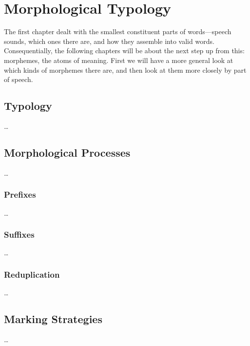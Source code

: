 
\chapter{Morphological Typology}

The first chapter dealt with the smallest constituent parts of words---speech 
sounds, which ones there are, and how they assemble into valid words. 
Consequentially, the following chapters will be about the next step up from 
this: morphemes, the atoms of meaning. First we will have a more general look 
at which kinds of morphemes there are, and then look at them more closely by 
part of speech.

\section{Typology}

…

\section{Morphological Processes}

…

\subsection{Prefixes}

…

\subsection{Suffixes}

…

\subsection{Reduplication}

…

\section{Marking Strategies}

…

